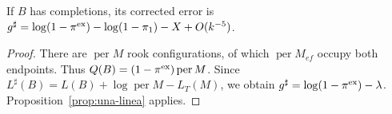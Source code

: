 \begin{corolario}\label{cor:linea-evitacion}
If $B$ has completions, its corrected error is $g^\sharp=\log(1-\pi^{\rm
ex})-\log(1-\pi_1)-X+O(k^{-5})$.
\end{corolario}
\begin{proof}
There are $\operatorname{per}M$ rook configurations, of which $\operatorname{per}M_{ef}$ occupy
both endpoints. Thus $Q(B)=(1-\pi^{\rm ex})\operatorname{per}M$. Since
$L^\sharp(B)=L(B)+\log\operatorname{per}M-L_T(M)$, we obtain $g^\sharp=\log(1-\pi^{\rm
ex})-\lambda$. Proposition~\ref{prop:una-linea} applies.
\end{proof}
